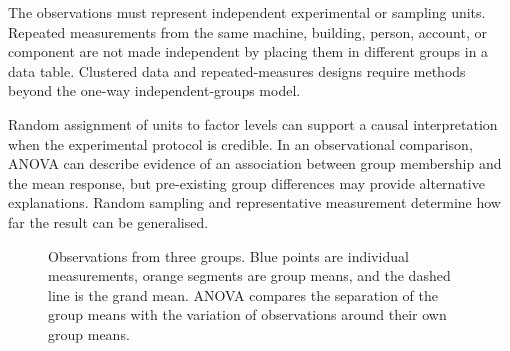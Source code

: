 The observations must represent independent experimental or sampling units. Repeated measurements from the same machine, building, person, account, or component are not made independent by placing them in different groups in a data table. Clustered data and repeated-measures designs require methods beyond the one-way independent-groups model.

Random assignment of units to factor levels can support a causal interpretation when the experimental protocol is credible. In an observational comparison, ANOVA can describe evidence of an association between group membership and the mean response, but pre-existing group differences may provide alternative explanations. Random sampling and representative measurement determine how far the result can be generalised.

\begin{figure}[htbp]
\centering
{}
\caption{Observations from three groups. Blue points are individual measurements, orange segments are group means, and the dashed line is the grand mean. ANOVA compares the separation of the group means with the variation of observations around their own group means.}
\label{fig:anova-between-within}
\end{figure}

\FloatBarrier

